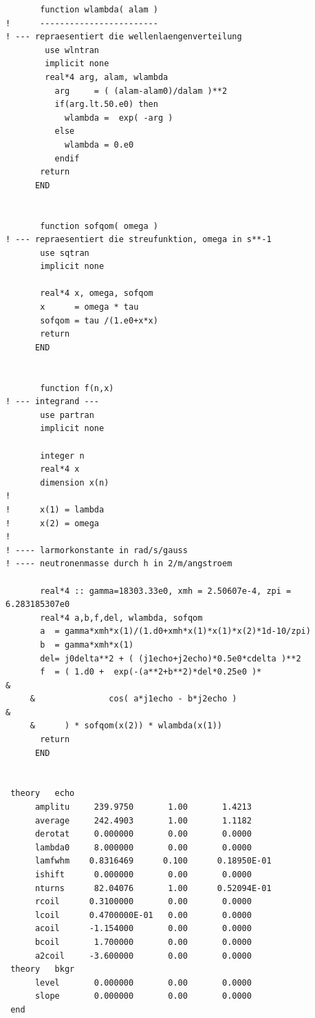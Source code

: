 \documentclass[11pt,fleqn]{book} %
\begin{document}
\begin{verbatim}
       function wlambda( alam )
!      ------------------------
! --- repraesentiert die wellenlaengenverteilung
        use wlntran
        implicit none
        real*4 arg, alam, wlambda
          arg     = ( (alam-alam0)/dalam )**2
          if(arg.lt.50.e0) then
            wlambda =  exp( -arg )
          else
            wlambda = 0.e0
          endif
       return
      END


       function sofqom( omega )
! --- repraesentiert die streufunktion, omega in s**-1
       use sqtran
       implicit none

       real*4 x, omega, sofqom
       x      = omega * tau
       sofqom = tau /(1.e0+x*x)
       return
      END


       function f(n,x)
! --- integrand ---
       use partran
       implicit none

       integer n
       real*4 x
       dimension x(n)
!
!      x(1) = lambda
!      x(2) = omega
!
! ---- larmorkonstante in rad/s/gauss
! ---- neutronenmasse durch h in 2/m/angstroem

       real*4 :: gamma=18303.33e0, xmh = 2.50607e-4, zpi = 6.283185307e0
       real*4 a,b,f,del, wlambda, sofqom
       a  = gamma*xmh*x(1)/(1.d0+xmh*x(1)*x(1)*x(2)*1d-10/zpi)
       b  = gamma*xmh*x(1)
       del= j0delta**2 + ( (j1echo+j2echo)*0.5e0*cdelta )**2
       f  = ( 1.d0 +  exp(-(a**2+b**2)*del*0.25e0 )*                    &
     &               cos( a*j1echo - b*j2echo )                         &
     &      ) * sofqom(x(2)) * wlambda(x(1))
       return
      END


 theory   echo                                                                            
      amplitu     239.9750       1.00       1.4213    
      average     242.4903       1.00       1.1182    
      derotat     0.000000       0.00       0.0000    
      lambda0     8.000000       0.00       0.0000    
      lamfwhm    0.8316469      0.100      0.18950E-01
      ishift      0.000000       0.00       0.0000    
      nturns      82.04076       1.00      0.52094E-01
      rcoil      0.3100000       0.00       0.0000    
      lcoil      0.4700000E-01   0.00       0.0000    
      acoil      -1.154000       0.00       0.0000    
      bcoil       1.700000       0.00       0.0000    
      a2coil     -3.600000       0.00       0.0000    
 theory   bkgr                                                                            
      level       0.000000       0.00       0.0000    
      slope       0.000000       0.00       0.0000    
 end
\end{verbatim}
\end{document}
